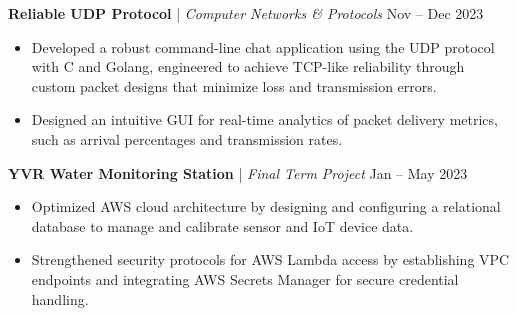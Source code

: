 \documentclass{resume}
\begin{document}
\vspace{6pt}
\noindent \textbf{Reliable UDP Protocol} | \textit{Computer Networks \& Protocols} \hfill Nov – Dec 2023
\begin{itemize}
  \item Developed a robust command-line chat application using the UDP protocol with C and Golang, engineered to achieve TCP-like reliability through custom packet designs that minimize loss and transmission errors.
  \item Designed an intuitive GUI for real-time analytics of packet delivery metrics, such as arrival percentages and transmission rates.
\end{itemize}

\vspace{6pt}
\noindent \textbf{YVR Water Monitoring Station} | \textit{Final Term Project} \hfill Jan – May 2023
\begin{itemize}
  \item Optimized AWS cloud architecture by designing and configuring a relational database to manage and calibrate sensor and IoT device data.
  \item Strengthened security protocols for AWS Lambda access by establishing VPC endpoints and integrating AWS Secrets Manager for secure credential handling.
\end{itemize}
\end{document}
